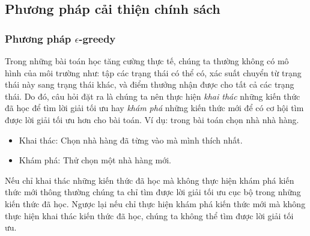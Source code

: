 \subsection{Phương pháp cải thiện chính sách}

\subsubsection*{Phương pháp $\epsilon$-greedy}
Trong những bài toán học tăng cường thực tế, chúng ta thường không có mô hình của môi trường như: tập các trạng thái có thể có, xác suất chuyển từ trạng thái này sang trạng thái khác, và điểm thưởng nhận được cho tất cả các trạng thái. Do đó, câu hỏi đặt ra là chúng ta nên thực hiện \textit{khai thác} những kiến thức đã học để tìm lời giải tối ưu hay \textit{khám phá} những kiến thức mới để có cơ hội tìm được lời giải tối ưu hơn cho bài toán. Ví dụ: trong bài toán chọn nhà nhà hàng.
\begin{itemize}
	\item Khai thác: Chọn nhà hàng đã từng vào mà mình thích nhất.
	\item Khám phá: Thử chọn một nhà hàng mới.
\end{itemize}
Nếu chỉ khai thác những kiến thức đã học mà không thực hiện khám phá kiến thức mới thông thường chúng ta chỉ tìm được lời giải tối ưu cục bộ trong những kiến thức đã học. Ngược lại nếu chỉ thực hiện khám phá kiến thức mới mà không thực hiện khai thác kiến thức đã học, chúng ta không thể tìm được lời giải tối ưu.

